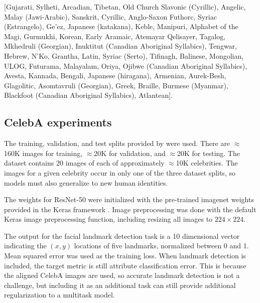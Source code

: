 \documentclass{article}
\theoremstyle{definition}
\theoremstyle{remark}
\begin{document}
[Gujarati,
             Sylheti,
             Arcadian,
             Tibetan,
             Old Church Slavonic (Cyrillic),
             Angelic,
             Malay (Jawi-Arabic),
             Sanskrit,
             Cyrillic,
             Anglo-Saxon Futhorc,
             Syriac (Estrangelo),
             Ge'ez,
             Japanese (katakana),
             Keble,
             Manipuri,
             Alphabet of the Magi,
             Gurmukhi,
             Korean,
             Early Aramaic,
             Atemayar Qelisayer,
             Tagalog,
             Mkhedruli (Georgian),
             Inuktitut (Canadian Aboriginal Syllabics),
             Tengwar,
             Hebrew,
             N'Ko,
             Grantha,
             Latin,
             Syriac (Serto),
             Tifinagh,
             Balinese,
             Mongolian,
             ULOG,
             Futurama,
             Malayalam,
             Oriya,
             Ojibwe (Canadian Aboriginal Syllabics),
             Avesta,
             Kannada,
             Bengali,
             Japanese (hiragana),
             Armenian,
             Aurek-Besh,
             Glagolitic,
             Asomtavruli (Georgian),
             Greek,
             Braille,
             Burmese (Myanmar),
             Blackfoot (Canadian Aboriginal Syllabics),
             Atlantean].

\subsection{CelebA experiments} \label{app:celeba}

The training, validation, and test splits provided by \cite{Liu:2015b} were used.
There are $\approx$160K images for training, $\approx$20K for validation, and $\approx$20K for testing.
The dataset contains 20 images of each of approximately $\approx$10K celebrities.
The images for a given celebrity occur in only one of the three dataset splits, so models must also generalize to new human identities.

The weights for ResNet-50 were initialized with the pre-trained imagenet weights provided in the Keras framework \cite{Chollet:2015}.
Image preprocessing was done with the default Keras image preprocessing function, including resizing all images to $224\times224$.

The output for the facial landmark detection task is a 10 dimensional vector indicating the $(x,y)$ locations of five landmarks, normalized between 0 and 1.
Mean squared error was used as the training loss.
When landmark detection is included, the target metric is still attribute classification error.
This is because the aligned CelebA images are used, so accurate landmark detection is not a challenge, but including it as an additional task can still provide additional regularization to a multitask model.
\end{document}

